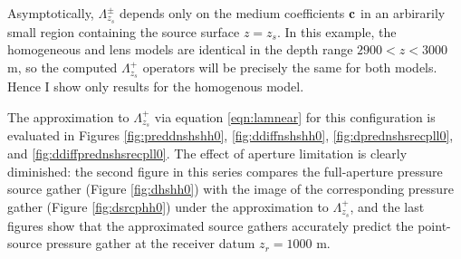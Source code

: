 \documentclass[georeport,12pt]{geophysics}
\begin{document}
Asymptotically, $\Lambda^{\pm}_{z_s}$ depends only on the medium
coefficients ${\bf c}$ in an arbirarily small region containing the
source surface $z=z_s$. In this example, the homogeneous and lens models are identical in the depth
range $2900 < z < 3000$ m, so the computed $\Lambda^+_{z_s}$ operators
will be precisely the same for both models. Hence I show only results for the
homogenous model.

The approximation to $\Lambda_{z_s}^+$ via equation \ref{eqn:lamnear}
for this configuration is evaluated in
Figures \ref{fig:preddnshshh0}, \ref{fig:ddiffnshshh0},
\ref{fig:dprednshsrecpll0}, and \ref{fig:ddiffprednshsrecpll0}. The effect of aperture
limitation is clearly diminished: the second figure in this series
compares the full-aperture pressure source gather (Figure
\ref{fig:dhshh0}) with the 
image of the corresponding pressure gather (Figure \ref{fig:dsrcphh0})
under the approximation to $\Lambda_{z_s}^+$, and the last figures
show that the approximated source gathers accurately predict the
point-source pressure gather at the receiver datum $z_r=1000$ m.





\end{document}
